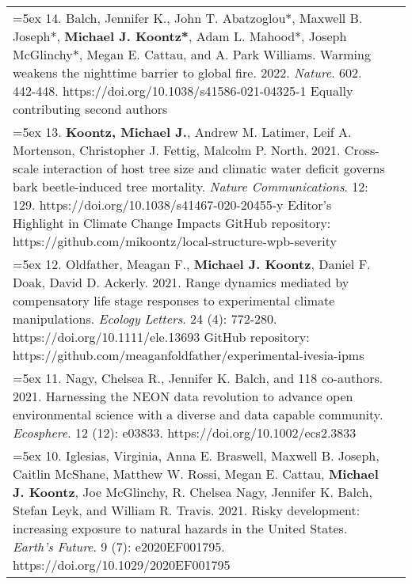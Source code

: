 \begin{longtable}{@{} >{\raggedright}p{6.10in} >{\raggedleft}X @{}}

\hangindent=5ex 14. Balch, Jennifer K., John T. Abatzoglou*, Maxwell B. Joseph*, \textbf{Michael J. Koontz*}, Adam L. Mahood*, Joseph McGlinchy*, Megan E. Cattau, and A. Park Williams. Warming weakens the nighttime barrier to global fire. 2022. \emph{Nature}. 602. 442-448. https://doi.org/10.1038/s41586-021-04325-1
\newline *Equally contributing second authors & \tabularnewline

\hangindent=5ex 13. \textbf{Koontz, Michael J.}, Andrew M. Latimer, Leif A. Mortenson, Christopher J. Fettig, Malcolm P. North. 2021. Cross-scale interaction of host tree size and climatic water deficit governs bark beetle-induced tree mortality. \emph{Nature Communications}. 12: 129. https://doi.org/10.1038/s41467-020-20455-y
\newline *Editor's Highlight in Climate Change Impacts %
\newline GitHub repository: https://github.com/mikoontz/local-structure-wpb-severity & \tabularnewline

\hangindent=5ex 12. Oldfather, Meagan F., \textbf{Michael J. Koontz}, Daniel F. Doak, David D. Ackerly. 2021. Range dynamics mediated by compensatory life stage responses to experimental climate manipulations. \emph{Ecology Letters}. 24 (4): 772-280. https://doi.org/10.1111/ele.13693
\newline GitHub repository: https://github.com/meaganfoldfather/experimental-ivesia-ipms & \tabularnewline

\hangindent=5ex 11. Nagy, Chelsea R., Jennifer K. Balch, and 118 co-authors. 2021. Harnessing the NEON data revolution to advance open environmental science with a diverse and data capable community. \emph{Ecosphere}. 12 (12): e03833. https://doi.org/10.1002/ecs2.3833 & \tabularnewline

\hangindent=5ex 10. Iglesias, Virginia, Anna E. Braswell, Maxwell B. Joseph, Caitlin McShane, Matthew W. Rossi, Megan E. Cattau, \textbf{Michael J. Koontz}, Joe McGlinchy, R. Chelsea Nagy, Jennifer K. Balch, Stefan Leyk, and William R. Travis. 2021. Risky development: increasing exposure to natural hazards in the United States. \emph{Earth's Future}. 9 (7): e2020EF001795. https://doi.org/10.1029/2020EF001795 & \tabularnewline


\end{longtable}
